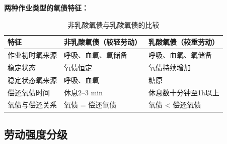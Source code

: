 \begin{keybox}
\textbf{两种作业类型的氧债特征：}

\begin{table}[H]
\centering
\caption{非乳酸氧债与乳酸氧债的比较}
\begin{tabularx}{\textwidth}{lXX}
\hline
\textbf{特征} & \textbf{非乳酸氧债（较轻劳动）} & \textbf{乳酸氧债（较重劳动）} \\
\hline
作业初时氧来源 & 呼吸、血氧、氧储备 & 呼吸、血氧、氧储备 \\
稳定状态 & 氧债恒定 & 氧债持续增加 \\
稳定状态氧来源 & 呼吸、血氧 & 糖原 \\
偿还氧债时间 & 休息2--3 min & 休息数十分钟至1h以上 \\
氧债与偿还关系 & 氧债 = 偿还氧债 & 氧债 < 偿还氧债 \\
\hline
\end{tabularx}
\end{table}
\end{keybox}

\subsection{劳动强度分级}

